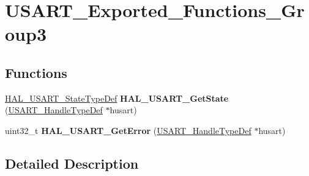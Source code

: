 \hypertarget{group___u_s_a_r_t___exported___functions___group3}{}\section{U\+S\+A\+R\+T\+\_\+\+Exported\+\_\+\+Functions\+\_\+\+Group3}
\label{group___u_s_a_r_t___exported___functions___group3}
\subsection*{Functions}
\begin{DoxyCompactItemize}
\item 
\hyperlink{group___u_s_a_r_t___exported___types_ga502e7abdfa6b24f0f6b40cf60c7383c5}{H\+A\+L\+\_\+\+U\+S\+A\+R\+T\+\_\+\+State\+Type\+Def} {\bfseries H\+A\+L\+\_\+\+U\+S\+A\+R\+T\+\_\+\+Get\+State} (\hyperlink{struct_u_s_a_r_t___handle_type_def}{U\+S\+A\+R\+T\+\_\+\+Handle\+Type\+Def} $\ast$husart)\hypertarget{group___u_s_a_r_t___exported___functions___group3_ga4fd7b79a07f70c5c9b4d13b7aaf147e8}{}\label{group___u_s_a_r_t___exported___functions___group3_ga4fd7b79a07f70c5c9b4d13b7aaf147e8}

\item 
uint32\+\_\+t {\bfseries H\+A\+L\+\_\+\+U\+S\+A\+R\+T\+\_\+\+Get\+Error} (\hyperlink{struct_u_s_a_r_t___handle_type_def}{U\+S\+A\+R\+T\+\_\+\+Handle\+Type\+Def} $\ast$husart)\hypertarget{group___u_s_a_r_t___exported___functions___group3_ga0a6ae309b21478da71f41cbc2b72fc47}{}\label{group___u_s_a_r_t___exported___functions___group3_ga0a6ae309b21478da71f41cbc2b72fc47}

\end{DoxyCompactItemize}


\subsection{Detailed Description}
